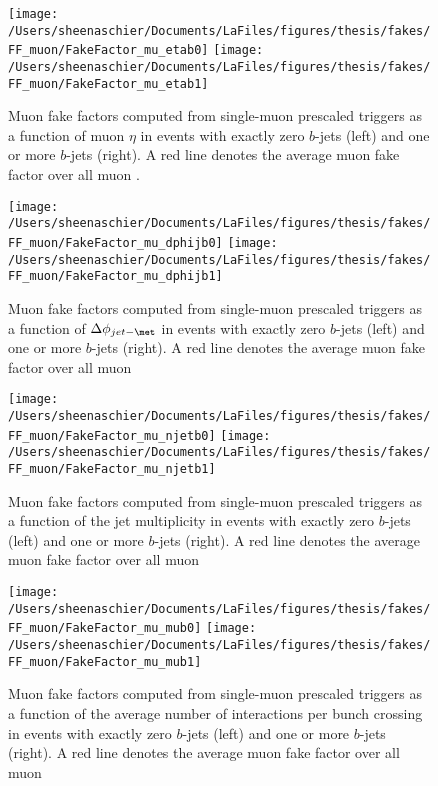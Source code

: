 \begin{figure}[tbp]
  \centering
  \texttt{[image: /Users/sheenaschier/Documents/LaFiles/figures/thesis/fakes/FF\_muon/FakeFactor\_mu\_etab0]}
  \texttt{[image: /Users/sheenaschier/Documents/LaFiles/figures/thesis/fakes/FF\_muon/FakeFactor\_mu\_etab1]}\\
  \caption{Muon fake factors computed from single-muon prescaled triggers as a function of muon $\eta$ in events with exactly zero $b$-jets (left) and one or more $b$-jets (right). A red line denotes the average muon fake factor over all muon \pt{}.}
  \label{fig:muon_FF_hist_eta}
\end{figure}

\begin{figure}[tbp]
  \centering
  \texttt{[image: /Users/sheenaschier/Documents/LaFiles/figures/thesis/fakes/FF\_muon/FakeFactor\_mu\_dphijb0]}
  \texttt{[image: /Users/sheenaschier/Documents/LaFiles/figures/thesis/fakes/FF\_muon/FakeFactor\_mu\_dphijb1]}
  \caption{Muon fake factors computed from single-muon prescaled triggers as a function of $\Delta\phi_{jet-\met}$ in events with exactly zero $b$-jets (left) and one or more $b$-jets (right).  A red line denotes the average muon fake factor over all muon \pt{}}
  \label{fig:muon_FF_dphij1}
\end{figure}

\begin{figure}[tbp]
  \centering
  \texttt{[image: /Users/sheenaschier/Documents/LaFiles/figures/thesis/fakes/FF\_muon/FakeFactor\_mu\_njetb0]}
  \texttt{[image: /Users/sheenaschier/Documents/LaFiles/figures/thesis/fakes/FF\_muon/FakeFactor\_mu\_njetb1]}\\
  \caption{Muon fake factors computed from single-muon prescaled triggers as a function of the jet multiplicity in events with exactly zero $b$-jets (left) and one or more $b$-jets (right).  A red line denotes the average muon fake factor over all muon \pt{}}
  \label{fig:muon_FF_njet}
\end{figure}

\begin{figure}[tbp]
  \centering
  \texttt{[image: /Users/sheenaschier/Documents/LaFiles/figures/thesis/fakes/FF\_muon/FakeFactor\_mu\_mub0]}
  \texttt{[image: /Users/sheenaschier/Documents/LaFiles/figures/thesis/fakes/FF\_muon/FakeFactor\_mu\_mub1]}\\
  \caption{Muon fake factors computed from single-muon prescaled triggers as a function of the average number of interactions per bunch crossing in events with exactly zero $b$-jets (left) and one or more $b$-jets (right).  A red line denotes the average muon fake factor over all muon \pt{}}
  \label{fig:muon_FF_mu}
\end{figure}

